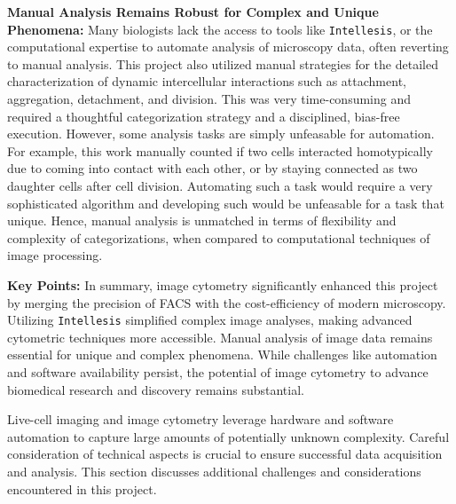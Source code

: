 \textbf{Manual Analysis Remains Robust for Complex and Unique Phenomena:}
Many biologists lack the access to tools like \texttt{Intellesis}, or the
computational expertise to automate analysis of microscopy data, often reverting
to manual analysis. This project also utilized manual strategies for the
detailed characterization of dynamic intercellular interactions such as
attachment, aggregation, detachment, and division. This was very time-consuming
and required a thoughtful categorization strategy and a disciplined, bias-free
execution. However, some analysis tasks are simply unfeasable for automation.
For example, this work manually counted if two \INA cells interacted
homotypically due to coming into contact with each other, or by staying
connected as two daughter cells after cell division. Automating such a task
would require a very sophisticated algorithm and developing such would be
unfeasable for a task that unique. Hence, manual analysis is unmatched in terms
of flexibility and complexity of categorizations, when compared to computational
techniques of image processing.





\textbf{Key Points:} In summary, image cytometry significantly enhanced this
project by merging the precision of \ac{FACS} with the cost-efficiency of modern
microscopy. Utilizing \texttt{Intellesis} simplified complex image analyses,
making advanced cytometric techniques more accessible. Manual analysis of image
data remains essential for unique and complex phenomena. While challenges like
automation and software availability persist, the potential of image cytometry
to advance biomedical research and discovery remains substantial.




%
\label{sec:discussion_quantifying_microscopy}%
Live-cell imaging and image cytometry leverage hardware and software automation
to capture large amounts of potentially unknown complexity. Careful
consideration of technical aspects is crucial to ensure successful data
acquisition and analysis. This section discusses additional challenges and
considerations encountered in this project.

